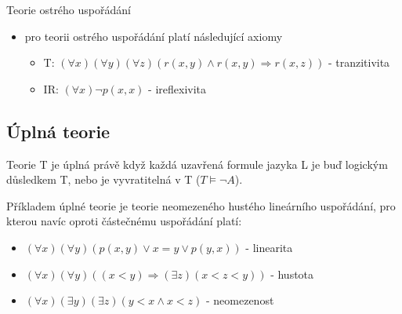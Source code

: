 \documentclass{szzclass}
\begin{document}
Teorie ostrého uspořádání
\begin{itemize}
  \item pro teorii ostrého uspořádání platí následující axiomy
  \begin{itemize}
    \item T: $(\forall{x})(\forall{y})(\forall{z})(r(x,y) \wedge r(x,y) \Rightarrow r(x,z))$ - tranzitivita
    \item IR: $(\forall{x})\neg p(x,x)$ - ireflexivita
  \end{itemize}
\end{itemize}
\subsection{Úplná teorie}
Teorie T je úplná právě když každá uzavřená formule jazyka L je buď logickým důsledkem T, nebo je vyvratitelná v T ($T \models \neg A$).

Příkladem úplné teorie je teorie neomezeného hustého lineárního uspořádání, pro kterou navíc oproti částečnému uspořádání platí:
\begin{itemize}
  \item $(\forall x)(\forall y)(p(x, y) \lor x = y \lor p(y, x))$ - linearita
  \item $(\forall x)(\forall y)((x < y) \Rightarrow (\exists z)(x < z < y))$ - hustota
  \item $(\forall{x})(\exists{y})(\exists{z})(y < x \wedge x < z)$ - neomezenost
\end{itemize}
\end{document}
